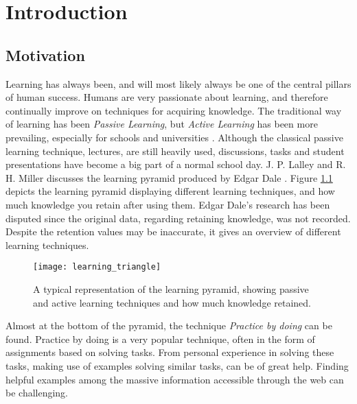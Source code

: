 
\chapter{Introduction} \label{cap_1}

\section{Motivation}

Learning has always been, and will most likely always be one of the central pillars of human success. Humans are very passionate about learning, and therefore continually improve on techniques for acquiring knowledge. The traditional way of learning has been \textit{Passive Learning}, but \textit{Active Learning} has been more prevailing, especially for schools and universities \cite{active-learning}. Although the classical passive learning technique, lectures, are still heavily used, discussions, tasks and student presentations have become a big part of a normal school day. J. P. Lalley and R. H. Miller discusses the learning pyramid produced by Edgar Dale \cite{learning_pyramid}. Figure \ref{fig:lt} depicts the learning pyramid displaying different learning techniques, and how much knowledge you retain after using them. Edgar Dale's research has been disputed since the original data, regarding retaining knowledge, was not recorded. Despite the retention values may be inaccurate, it gives an overview of different learning techniques. 

\begin{figure}[h] 
\caption{A typical representation of the learning pyramid, showing passive and active learning techniques and how much knowledge retained.}
\texttt{[image: learning\_triangle]}
\label{fig:lt}
\end{figure}

Almost at the bottom of the pyramid, the technique \textit{Practice by doing} can be found. Practice by doing is a very popular technique, often in the form of assignments based on solving tasks. From personal experience in solving these tasks, making use of examples solving similar tasks, can be of great help. Finding helpful examples among the massive information accessible through the web can be challenging.

